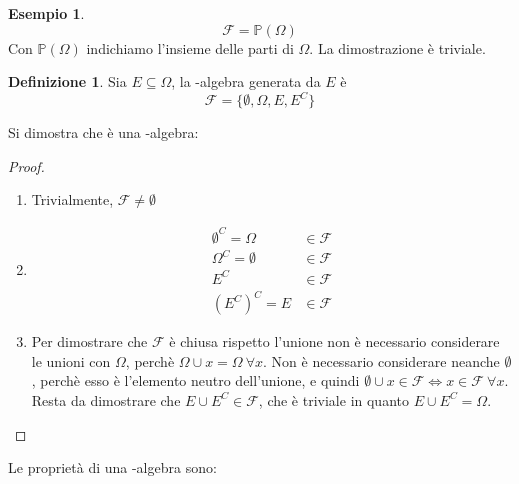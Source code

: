 \documentclass{article}
\theoremstyle{plain}
\theoremstyle{definition}
\newtheorem{definizione}{Definizione}[section]
\newtheorem{esempio}{Esempio}[section]
\theoremstyle{remark}
\begin{document}
\begin{esempio}
	\begin{equation*}
		\mathscr{F}=\mathds{P}(\Omega)
	\end{equation*}
	Con $\mathds{P}(\Omega)$ indichiamo l'insieme delle parti di $\Omega$. La dimostrazione è triviale.
\end{esempio}
\begin{definizione}
	Sia $E\subseteq\Omega$, la \sigma-algebra generata da $E$ è
	\begin{equation*}
		\mathscr{F}=\{\emptyset,\Omega,E,E^C\}
	\end{equation*}
\end{definizione}
Si dimostra che è una \sigma-algebra:
\begin{proof}
	\begin{enumerate}
		\item Trivialmente, $\mathscr{F}\neq\emptyset$
		\item 
		\begin{align*}
			\emptyset^C=\Omega&\in\mathscr{F}\\
			\Omega^C=\emptyset&\in\mathscr{F}\\
			E^C&\in\mathscr{F}\\
			(E^C)^C=E&\in\mathscr{F}
		\end{align*}
		\item Per dimostrare che $\mathscr{F}$ è chiusa rispetto l'unione non è necessario considerare le unioni con $\Omega$, perchè $\Omega\cup x=\Omega\ \forall x$. Non è necessario considerare neanche $\emptyset$, perchè esso è l'elemento neutro dell'unione, e quindi $\emptyset\cup x\in\mathscr{F}\Leftrightarrow x\in\mathscr{F}\ \forall x$. Resta da dimostrare che $E\cup E^C\in\mathscr{F}$, che è triviale in quanto $E\cup E^C=\Omega$.
	\end{enumerate}
\end{proof}
Le proprietà di una \sigma-algebra sono:
\end{document}
